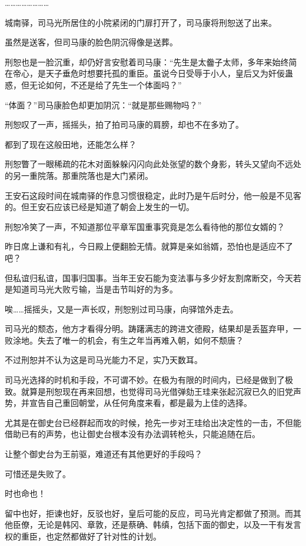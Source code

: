 ……………………

城南驿，司马光所居住的小院紧闭的门扉打开了，司马康将刑恕送了出来。

虽然是送客，但司马康的脸色阴沉得像是送葬。

刑恕也是一脸沉重，却仍好言安慰着司马康：“先生是太齤子太师，多年来始终简在帝心，是天子垂危时想要托孤的重臣。虽说今日受辱于小人，皇后又为奸佞蛊惑，但无论如何，不还是给了先生一个体面吗？”

“体面？”司马康脸色却更加阴沉：“就是那些赐物吗？”

刑恕叹了一声，摇摇头，拍了拍司马康的肩膀，却也不在多劝了。

都到了现在这般田地，还能怎么样？

刑恕瞥了一眼稀疏的花木对面躲躲闪闪向此处张望的数个身影，转头又望向不远处的另一重院落。那重院落也是大门紧闭。

王安石这段时间在城南驿的作息习惯很稳定，此时乃是午后时分，他一般是不见客的。但王安石应该已经是知道了朝会上发生的一切。

刑恕冷笑了一声，不知道那位平章军国重事究竟是怎么看待他的那位女婿的？

昨日席上谦和有礼，今日殿上便翻脸无情。就算是亲如翁婿，恐怕也是适应不了吧？

但私谊归私谊，国事归国事。当年王安石能为变法事与多少好友割席断交，今天若是知道司马光大败亏输，当是击节叫好的为多。

唉……摇摇头，又是一声长叹，刑恕别过司马康，向驿馆外走去。

司马光的颓态，他方才看得分明。踌躇满志的跨进文德殿，结果却是丢盔弃甲，一败涂地。失去了唯一的机会，有生之年当再难入朝，如何不颓唐？

不过刑恕并不认为这是司马光能力不足，实乃天数耳。

司马光选择的时机和手段，不可谓不妙。在极为有限的时间内，已经是做到了极致。就算是刑恕现在再来回想，也觉得司马光借弹劾王珪来张起沉寂已久的旧党声势，并宣告自己重回朝堂，从任何角度来看，都是最为上佳的选择。

尤其是在御史台已经群起而攻的时候，抢先一步对王珪给出决定性的一击，不但能借助已有的声势，也让御史台根本没有办法调转枪头，只能追随在后。

让整个御史台为王前驱，难道还有其他更好的手段吗？

可惜还是失败了。

时也命也！

留中也好，拒谏也好，反驳也好，皇后可能的反应，司马光肯定都做了预测。而其他臣僚，无论是韩冈、章敦，还是蔡确、韩缜，包括下面的御史，以及一干有发言权的重臣，也定然都做好了针对性的计划。


